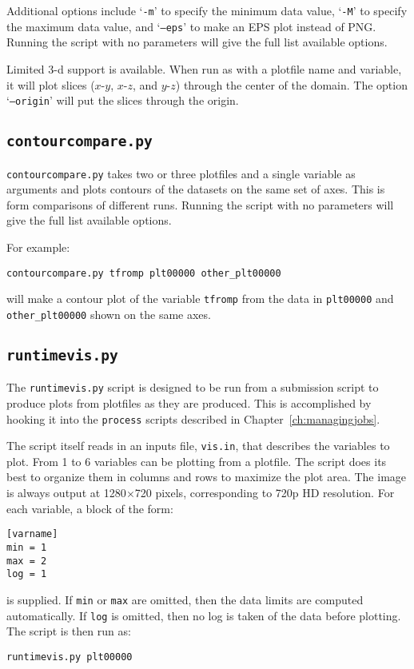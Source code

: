 Additional options include `{\tt -m}' to specify the minimum data
value, `{\tt -M}' to specify the maximum data value, and `{\tt --eps}'
to make an EPS plot instead of PNG.  Running the script with no parameters
will give the full list available options.


Limited 3-d support is available.  When run as with a plotfile name
and variable, it will plot slices ($x$-$y$, $x$-$z$, and $y$-$z$) 
through the center of the domain.  The option `{\tt --origin}'
will put the slices through the origin.


\subsection{\tt contourcompare.py}

{\tt contourcompare.py} takes two or three plotfiles and a single variable as arguments
and plots contours of the datasets on the same set of axes.  This is 
form comparisons of different runs.  Running the script with no parameters
will give the full list available options.

For example:
\begin{verbatim}
contourcompare.py tfromp plt00000 other_plt00000
\end{verbatim}
will make a contour plot of the variable {\tt tfromp} from the data in
{\tt plt00000} and {\tt other\_plt00000} shown on the same axes.  


\subsection{\tt runtimevis.py}

The {\tt runtimevis.py} script is designed to be run from a submission
script to produce plots from plotfiles as they are produced.  This is
accomplished by hooking it into the {\tt process} scripts described in
Chapter~\ref{ch:managingjobs}.

The script itself reads in an inputs file, {\tt vis.in}, that
describes the variables to plot.  From 1 to 6 variables can be
plotting from a plotfile.  The script does its best to organize them
in columns and rows to maximize the plot area.  The image is always
output at 1280$\times$720 pixels, corresponding to 720p HD resolution.
For each variable, a block of the form:
\begin{verbatim}
[varname]
min = 1
max = 2
log = 1
\end{verbatim}
is supplied.  If {\tt min} or {\tt max} are omitted, then the data
limits are computed automatically.  If {\tt log} is omitted, then no
log is taken of the data before plotting.  The script is then run as:
\begin{verbatim}
runtimevis.py plt00000
\end{verbatim}



